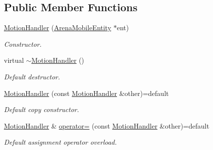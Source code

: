 \subsection*{Public Member Functions}
\begin{DoxyCompactItemize}
\item 
\mbox{\label{class_motion_handler_a48c0070bfda6acb8a7493eb7fe1200c4}} 
\mbox{\hyperlink{class_motion_handler_a48c0070bfda6acb8a7493eb7fe1200c4}{Motion\+Handler}} (\mbox{\hyperlink{class_arena_mobile_entity}{Arena\+Mobile\+Entity}} $\ast$ent)
\begin{DoxyCompactList}\small\item\em Constructor. \end{DoxyCompactList}\item 
\mbox{\label{class_motion_handler_aeb9e090d5d5f750767ea82d604f11c9c}} 
virtual \mbox{\hyperlink{class_motion_handler_aeb9e090d5d5f750767ea82d604f11c9c}{$\sim$\+Motion\+Handler}} ()
\begin{DoxyCompactList}\small\item\em Default destructor. \end{DoxyCompactList}\item 
\mbox{\label{class_motion_handler_a91dc98beab9d5ccce6b6c18ce32c0488}} 
\mbox{\hyperlink{class_motion_handler_a91dc98beab9d5ccce6b6c18ce32c0488}{Motion\+Handler}} (const \mbox{\hyperlink{class_motion_handler}{Motion\+Handler}} \&other)=default
\begin{DoxyCompactList}\small\item\em Default copy constructor. \end{DoxyCompactList}\item 
\mbox{\label{class_motion_handler_ad45188f2d9794fd2b257d586a7b522e6}} 
\mbox{\hyperlink{class_motion_handler}{Motion\+Handler}} \& \mbox{\hyperlink{class_motion_handler_ad45188f2d9794fd2b257d586a7b522e6}{operator=}} (const \mbox{\hyperlink{class_motion_handler}{Motion\+Handler}} \&other)=default
\begin{DoxyCompactList}\small\item\em Default assignment operator overload. \end{DoxyCompactList}\item 
\mbox{\label{class_motion_handler_a1f2d27b1f7032c40b72a50757146722d}} 

\end{DoxyCompactItemize}
